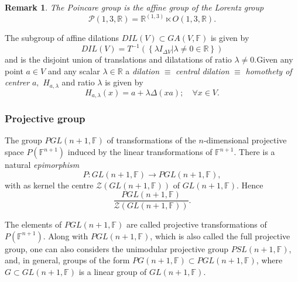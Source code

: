 \documentclass[aps,preprint]{revtex4}%
\newtheorem{remark}[theorem]{Remark}
\begin{document}
\begin{remark}
The \emph{Poincare group} is the affine group of the \emph{Lorentz group}
\begin{equation}
\mathcal{P}\left(  1,3,\mathbb{R}\right)  =\mathbb{R}^{\left(  1,3\right)
}\ltimes O\left(  1,3,\mathbb{R}\right)  .
\end{equation}

\end{remark}

The subgroup of affine dilations $DIL\left(  V\right)  \subset GA\left(
V,\mathbb{F}\right)  $ is given by
\begin{equation}
DIL\left(  V\right)  =T^{-1}\left(  \left\{  \left.  \lambda I_{\Delta
V}\right\vert \lambda\neq0\in\mathbb{R}\right\}  \right)
\end{equation}
and is the disjoint union of translations and dilatations of ratio
$\lambda\neq0.$Given any point $a\in V$ and any scalar $\lambda\in\mathbb{R}$
a \emph{dilation} $\equiv$ \emph{central} \emph{dilation} $\equiv$
\emph{homothety of centrer }$a,$ $H_{a,\lambda}$ and ratio $\lambda$ is given
by
\begin{equation}
H_{a,\lambda}\left(  x\right)  =a+\lambda\Delta\left(  xa\right)
;\quad\forall x\in V.
\end{equation}


\subsubsection{Projective group}

The group $PGL\left(  n+1,\mathbb{F}\right)  $ of transformations of the
$n$-dimensional projective space $P(\mathbb{F}^{n+1})$ induced by the linear
transformations of $\mathbb{F}^{n+1}$. There is a natural \emph{epimorphism}%
\begin{equation}
P:GL\left(  n+1,\mathbb{F}\right)  \rightarrow PGL\left(  n+1,\mathbb{F}%
\right)  ,
\end{equation}
with as kernel the centre $\mathcal{Z}\left(  GL\left(  n+1,\mathbb{F}\right)
\right)  $ of $GL\left(  n+1,\mathbb{F}\right)  $. Hence
\begin{equation}
\frac{PGL\left(  n+1,\mathbb{F}\right)  }{\mathcal{Z}\left(  GL\left(
n+1,\mathbb{F}\right)  \right)  }.
\end{equation}


The elements of $PGL\left(  n+1,\mathbb{F}\right)  $ are called projective
transformations of $P(\mathbb{F}^{n+1})$. Along with $PGL\left(
n+1,\mathbb{F}\right)  $, which is also called the full projective group, one
can also considers the unimodular projective group $PSL\left(  n+1,\mathbb{F}%
\right)  $, and, in general, groups of the form $PG\left(  n+1,\mathbb{F}%
\right)  \subset PGL\left(  n+1,\mathbb{F}\right)  $, where $G\subset
GL\left(  n+1,\mathbb{F}\right)  $ is a linear group of $GL\left(
n+1,\mathbb{F}\right)  $.
\end{document}
